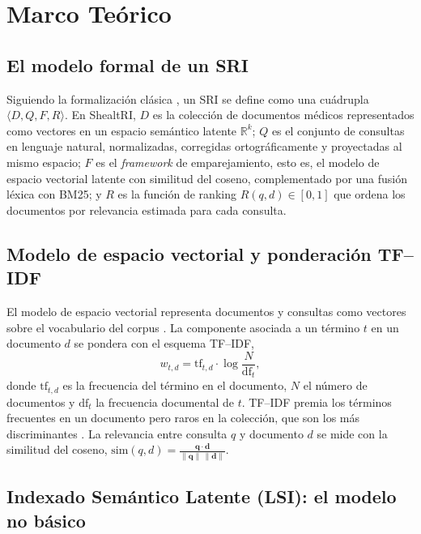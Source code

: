 \documentclass[runningheads,a4paper,14pts]{llncs}
\begin{document}
	\section{Marco Teórico}\label{sec:teoria}
	
	\subsection{El modelo formal de un SRI}
	
	Siguiendo la formalización clásica \cite{salton1983,baeza1999}, un SRI se define
	como una cuádrupla $\langle D, Q, F, R\rangle$. En ShealtRI, $D$ es la colección
	de documentos médicos representados como vectores en un espacio semántico latente $\mathbb{R}^{k}$; $Q$
	es el conjunto de consultas en lenguaje natural, normalizadas, corregidas
	ortográficamente y proyectadas al mismo espacio; $F$ es el \emph{framework} de
	emparejamiento, esto es, el modelo de espacio vectorial latente con similitud del
	coseno, complementado por una fusión léxica con BM25; y $R$ es la función de
	ranking $R(q,d)\!\in\![0,1]$ que ordena los documentos por relevancia estimada
	para cada consulta.
	
	\subsection{Modelo de espacio vectorial y ponderación TF--IDF}
	
	El modelo de espacio vectorial representa documentos y consultas como vectores
	sobre el vocabulario del corpus \cite{salton1983}. La componente asociada a un
	término $t$ en un documento $d$ se pondera con el esquema TF--IDF,
	\begin{equation}
		w_{t,d} = \mathrm{tf}_{t,d}\cdot \log\frac{N}{\mathrm{df}_t},
	\end{equation}
	donde $\mathrm{tf}_{t,d}$ es la frecuencia del término en el documento, $N$ el
	número de documentos y $\mathrm{df}_t$ la frecuencia documental de $t$. TF--IDF
	premia los términos frecuentes en un documento pero raros en la colección, que
	son los más discriminantes \cite{manning2008}. La relevancia entre consulta $q$
	y documento $d$ se mide con la similitud del coseno,
	$\mathrm{sim}(q,d)=\frac{\mathbf{q}\cdot\mathbf{d}}{\lVert\mathbf{q}\rVert\,\lVert\mathbf{d}\rVert}$.
	
	\subsection{Indexado Semántico Latente (LSI): el modelo no básico}
	
\end{document}
